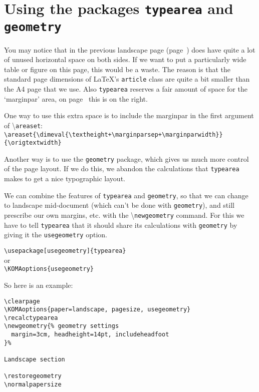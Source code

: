 \documentclass[twoside]{article}
\newcommand\cs[1]{\textbackslash\texttt{#1}}
\begin{document}
\clearpage
\normalpapersize

\section{Using the packages \texttt{typearea} and \texttt{geometry}}

You may notice that in the previous landscape page (page~\pageref{subsec:typearea}) does have quite a lot of unused horizontal space on both sides. If we want to put a particularly wide table or figure on this page, this would be a waste. The reason is that the standard page dimensions of \LaTeX's \texttt{article} class are quite a bit smaller than the A4 page that we use. Also \texttt{typearea} reserves a fair amount of space for the `marginpar' area, on page~\pageref{subsec:typearea} this is on the right.

One way to use this extra space is to include the marginpar in the first argument of \cs{areaset}:\\[.5ex]
\verb|\areaset{\dimeval{\textheight+\marginparsep+\marginparwidth}}{\origtextwidth}|
\vspace{.5ex}

Another way is to use the \texttt{geometry} package, which gives us much more control of the page layout. If we do this, we abandon the calculations that \texttt{typearea} makes to get a nice typographic layout.

We can combine the features of \texttt{typearea} and \texttt{geometry}, so that we can change to landscape mid-document (which can't be done with \texttt{geometry}), and still prescribe our own margins, etc. with the \cs{newgeometry} command. For this we have to tell \texttt{typearea} that it should share its calculations with \texttt{geometry} by giving it the \texttt{usegeometry} option.

\noindent\verb|\usepackage[usegeometry]{typearea}|\\
or\\
\verb|\KOMAoptions{usegeometry}|

So here is an example:

\medskip
\noindent
\begin{boxedminipage}{\textwidth}
\begin{verbatim}
\clearpage
\KOMAoptions{paper=landscape, pagesize, usegeometry}
\recalctypearea
\newgeometry{% geometry settings
  margin=3cm, headheight=14pt, includeheadfoot
}%

Landscape section

\restoregeometry
\normalpapersize
\end{verbatim}
\end{boxedminipage}
\end{document}

